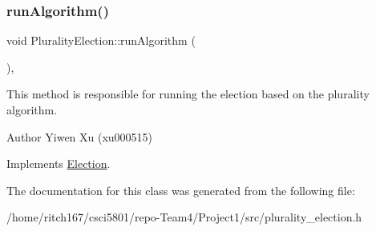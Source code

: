 \mbox{\label{classPluralityElection_a9517806e8ba40496c49013acc7ad9ca5}} 
\subsubsection{\texorpdfstring{run\+Algorithm()}{runAlgorithm()}}
{\footnotesize\ttfamily void Plurality\+Election\+::run\+Algorithm (\begin{DoxyParamCaption}{ }\end{DoxyParamCaption})\hspace{0.3cm}{\ttfamily [override]}, {\ttfamily [virtual]}}

This method is responsible for running the election based on the plurality algorithm. \begin{DoxyAuthor}{Author}
Yiwen Xu (xu000515) 
\end{DoxyAuthor}


Implements \hyperlink{classElection_a059659576ebb0416ecd8005f684461d6}{Election}.



The documentation for this class was generated from the following file\+:\begin{DoxyCompactItemize}
\item 
/home/ritch167/csci5801/repo-\/\+Team4/\+Project1/src/plurality\+\_\+election.\+h\end{DoxyCompactItemize}
